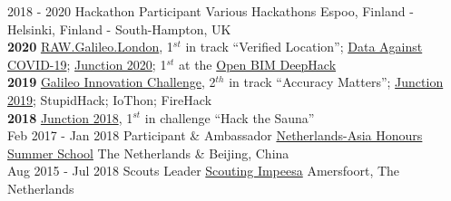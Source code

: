\documentclass[a4paper]{twentysecondcv} %
\begin{document}
\begin{twenty}
	\twentyitem
	{2018 -}
	{2020}
	{Hackathon Participant}
	{Various Hackathons}
	{Espoo, Finland - Helsinki, Finland - South-Hampton, UK}
	{
	\\ \textbf{2020} 
	    \href{https://raw.galileo.london/}{RAW.Galileo.London}, 1$^{st}$ in track ``Verified Location'';
	    \href{https://ultrahack.org/covid-19datahack/}{Data Against COVID-19}; \href{http://hackjunction.com/}{Junction 2020}; 1$^{st}$ at the \href{https://ultrahack.org/open-bim-deephack}{Open BIM DeepHack}
	\\ \textbf{2019} 
        \href{https://ultrahack.org/galileoinnovationchallenge}{Galileo Innovation Challenge}, 2$^{th}$ in track ``Accuracy Matters'';
        \href{http://hackjunction.com/}{Junction 2019};
        StupidHack;
        IoThon;
        FireHack
    \\ \textbf{2018} 
        \href{https://hackjunction.com}{Junction 2018}, 1$^{st}$ in challenge ``Hack the Sauna''
	}
	\\
	\twentyitem
	{Feb 2017 -}
	{Jan 2018}
	{Participant \& Ambassador}
	{\href{https://nahss.nl/en}{Netherlands-Asia Honours Summer School}}
	{The Netherlands \& Beijing, China}
	{
	}
	\\
	\twentyitem
	{Aug 2015 -}
	{Jul 2018}
	{Scouts Leader}
	{\href{https://www.impeesa.nl/}{Scouting Impeesa}}
	{Amersfoort, The Netherlands}
	{}
	\\
\end{twenty}
\end{document}

